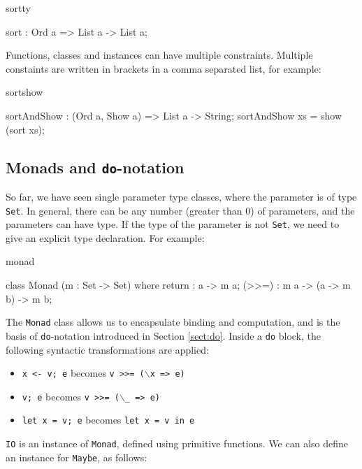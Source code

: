 \begin{SaveVerbatim}{sortty}

sort : Ord a => List a -> List a;

\end{SaveVerbatim}

\noindent
Functions, classes and instances can have multiple constraints. Multiple constaints are
written in brackets in a comma separated list, for example:

\begin{SaveVerbatim}{sortshow}

sortAndShow : (Ord a, Show a) => List a -> String;
sortAndShow xs = show (sort xs);

\end{SaveVerbatim}

\subsection{Monads and \texttt{do}-notation}

So far, we have seen single parameter type classes, where the parameter is of type
\texttt{Set}. In general, there can be any number (greater than 0) of parameters,
and the parameters can have  type.
If the type of the parameter is not \texttt{Set}, we need to give an explicit type
declaration. For example:

\begin{SaveVerbatim}{monad}

class Monad (m : Set -> Set) where {
    return : a -> m a;
    (>>=)  : m a -> (a -> m b) -> m b;
}

\end{SaveVerbatim}

The \texttt{Monad} class allows us to encapsulate binding and computation, and is the
basis of \texttt{do}-notation introduced in Section \ref{sect:do}. Inside a
\texttt{do} block, the following syntactic transformations are applied:

\begin{itemize}
\item \texttt{x <- v; e} becomes \texttt{v >>= ($\backslash$x => e)}
\item \texttt{v; e} becomes \texttt{v >>= ($\backslash$\_ => e)}
\item \texttt{let x = v; e} becomes \texttt{let x = v in e}
\end{itemize}

\noindent
\texttt{IO} is an instance of \texttt{Monad}, defined using primitive functions.
We can also define an instance for \texttt{Maybe}, as follows:

